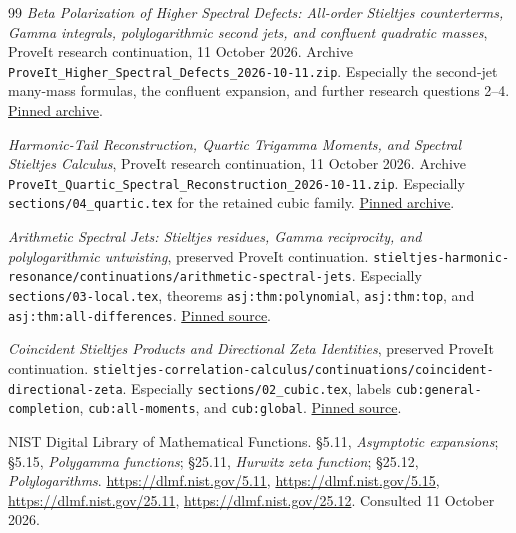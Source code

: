 \documentclass[11pt,letterpaper]{article}
\numberwithin{equation}{section}
\theoremstyle{definition}
\theoremstyle{remark}
\newcommand{\src}[1]{\nolinkurl{#1}}
\begin{document}
\begin{thebibliography}{99}
\emph{Beta Polarization of Higher Spectral Defects: All-order Stieltjes
counterterms, Gamma integrals, polylogarithmic second jets, and confluent
quadratic masses}, ProveIt research continuation, 11 October 2026.
Archive \src{ProveIt_Higher_Spectral_Defects_2026-10-11.zip}.
Especially the second-jet many-mass formulas, the confluent expansion, and
further research questions 2--4.
\href{https://github.com/VladimirReshetnikov/ProveIt/blob/e3d7ec5d3f9be259c1f91edaea4389f4e79b5b03/docs/incoming/ProveIt_Higher_Spectral_Defects_2026-10-11.zip}{Pinned archive}.

\emph{Harmonic-Tail Reconstruction, Quartic Trigamma Moments, and Spectral
Stieltjes Calculus}, ProveIt research continuation, 11 October 2026.
Archive \src{ProveIt_Quartic_Spectral_Reconstruction_2026-10-11.zip}.
Especially \src{sections/04_quartic.tex} for the retained cubic family.
\href{https://github.com/VladimirReshetnikov/ProveIt/blob/e3d7ec5d3f9be259c1f91edaea4389f4e79b5b03/docs/incoming/ProveIt_Quartic_Spectral_Reconstruction_2026-10-11.zip}{Pinned archive}.

\emph{Arithmetic Spectral Jets: Stieltjes residues, Gamma reciprocity,
and polylogarithmic untwisting}, preserved ProveIt continuation.
\src{stieltjes-harmonic-resonance/continuations/arithmetic-spectral-jets}.
Especially \src{sections/03-local.tex}, theorems
\src{asj:thm:polynomial}, \src{asj:thm:top}, and
\src{asj:thm:all-differences}.
\href{https://github.com/VladimirReshetnikov/ProveIt/blob/e3d7ec5d3f9be259c1f91edaea4389f4e79b5b03/Analysis/Polylogarithms/docs/reports/stieltjes-harmonic-resonance/continuations/arithmetic-spectral-jets/sections/03-local.tex}{Pinned source}.

\emph{Coincident Stieltjes Products and Directional Zeta Identities},
preserved ProveIt continuation.
\src{stieltjes-correlation-calculus/continuations/coincident-directional-zeta}.
Especially \src{sections/02_cubic.tex}, labels
\src{cub:general-completion}, \src{cub:all-moments}, and \src{cub:global}.
\href{https://github.com/VladimirReshetnikov/ProveIt/blob/e3d7ec5d3f9be259c1f91edaea4389f4e79b5b03/Analysis/Polylogarithms/docs/reports/stieltjes-correlation-calculus/continuations/coincident-directional-zeta/sections/02_cubic.tex}{Pinned source}.

NIST Digital Library of Mathematical Functions.
\S5.11, \emph{Asymptotic expansions};
\S5.15, \emph{Polygamma functions};
\S25.11, \emph{Hurwitz zeta function};
\S25.12, \emph{Polylogarithms}.
\url{https://dlmf.nist.gov/5.11},
\url{https://dlmf.nist.gov/5.15},
\url{https://dlmf.nist.gov/25.11},
\url{https://dlmf.nist.gov/25.12}.
Consulted 11 October 2026.


\end{thebibliography}
\end{document}
